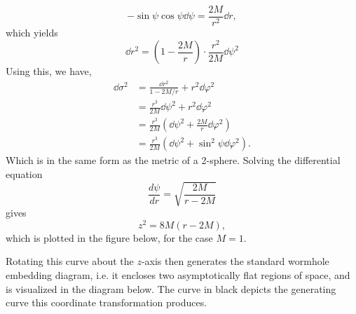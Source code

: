 \documentclass[%
 reprint,
 amsmath,amssymb
 aps,
]{revtex4}
\theoremstyle{remark}
\begin{document}
\begin{equation}
    -\sin\psi\cos\psi \dd{\psi} = \frac{2M}{r^2}\dd{r},
\end{equation}
which yields 
\begin{equation}
    \dd{r}^2 = \left(1-\frac{2M}{r}\right) \cdot \frac{r^2}{2M}\dd{\psi}^2
\end{equation}
Using this, we have,
\begin{align}
    \dd\sigma^2 &= \frac{\dd{r}^2}{1-2M/r}+r^2\dd{\varphi}^2 \\ 
    &= \frac{r^3}{2M} \dd{\psi}^2 + r^2\dd{\varphi}^2 \\ 
    &= \frac{r^3}{2M}\left(\dd{\psi}^2 + \frac{2M}{r}\dd{\varphi}^2\right) \\ 
    &= \frac{r^3}{2M}\left(\dd{\psi}^2 + \sin^2\psi\dd{\varphi}^2\right).
\end{align}
Which is in the same form as the metric of a 2-sphere. Solving the differential equation 
\begin{equation}
    \frac{d\psi}{dr} = \sqrt{\frac{2M}{r-2M}}
\end{equation} 
gives
\begin{equation}
    z^2 = 8M(r-2M),
\end{equation}
which is plotted in the figure below, for the case $M=1.$
\begin{center}

\end{center}
Rotating this curve about the $z$-axis then generates the standard wormhole embedding diagram, i.e. it encloses two asymptotically flat regions of space, and is visualized in the diagram below. The curve in black depicts the generating curve this coordinate transformation produces.
\begin{center}
\end{center}
\end{document}
